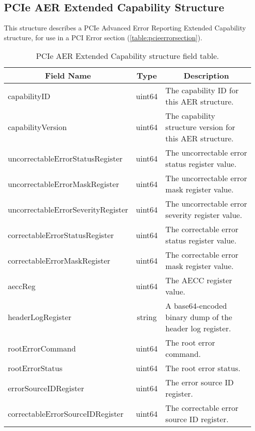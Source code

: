 \documentclass{report}
\newcommand*{\thead}[1]{\multicolumn{1}{|c|}{\bfseries #1}}
\newcommand*{\jsontable}[1]{
    \begin{table}[!ht]
    \label{#1}
    \centering
    \begin{adjustbox}{center}
    \begin{tabular}{|l|c|p{8cm}|}
    \hline
    \thead{Field Name} & \thead{Type} & \thead{Description} \\
    \hline
}
\newcommand*{\jsontableend}[1]{
    \hline
    \end{tabular}
    \end{adjustbox}
    \caption{#1}
    \label{table:#1}
    \end{table}
    \FloatBarrier
}
\begin{document}
\subsection{PCIe AER Extended Capability Structure}
\label{subsection:pcieaerecstructure}
This structure describes a PCIe Advanced Error Reporting Extended Capability structure, for use in a PCI Error section (\ref{table:pcieerrorsection}).
\jsontable{table:pcieaerecstructure}
capabilityID & uint64 & The capability ID for this AER structure.\\
\hline
capabilityVersion & uint64 & The capability structure version for this AER structure.\\
\hline
uncorrectableErrorStatusRegister & uint64 & The uncorrectable error status register value.\\
\hline
uncorrectableErrorMaskRegister & uint64 & The uncorrectable error mask register value.\\
\hline
uncorrectableErrorSeverityRegister & uint64 & The uncorrectable error severity register value.\\
\hline
correctableErrorStatusRegister & uint64 & The correctable error status register value.\\
\hline
correctableErrorMaskRegister & uint64 & The correctable error mask register value.\\
\hline
aeccReg & uint64 & The AECC register value.\\
\hline
headerLogRegister & string & A base64-encoded binary dump of the header log register.\\
\hline
rootErrorCommand & uint64 & The root error command.\\
\hline
rootErrorStatus & uint64 & The root error status.\\
\hline
errorSourceIDRegister & uint64 & The error source ID register.\\
\hline
correctableErrorSourceIDRegister & uint64 & The correctable error source ID register.\\
\jsontableend{PCIe AER Extended Capability structure field table.}

\end{document}
